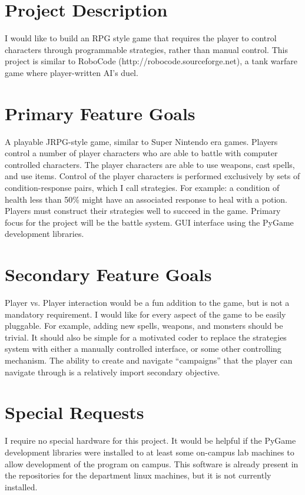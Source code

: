 \documentclass[12pt]{article}
\begin{document}
\title{}
\author{Mark Gius}
\date{\today}
\maketitle

\section{Project Description}
I would like to build an RPG style game that requires the player to control
characters through programmable strategies, rather than manual control. This
project is similar to RoboCode (http://robocode.sourceforge.net), a tank
warfare game where player-written AI's duel.

\section{Primary Feature Goals}
A playable JRPG-style game, similar to Super Nintendo era games.  Players
control a number of player characters who are able to battle with computer
controlled characters. The player characters are able to use weapons, cast
spells, and use items.  Control of the player characters is performed
exclusively by sets of condition-response pairs, which I call strategies.  For
example: a condition of health less than 50\% might have an associated response
to heal with a potion.  Players must construct their strategies well to succeed
in the game. Primary focus for the project will be the battle system. GUI
interface using the PyGame development libraries.

\section{Secondary Feature Goals}
Player vs. Player interaction would be a fun addition to the game, but is not a
mandatory requirement.  I would like for every aspect of the game to be easily
pluggable.  For example, adding new spells, weapons, and monsters should be
trivial.  It should also be simple for a motivated coder to replace the
strategies system with either a manually controlled interface, or some other
controlling mechanism.  The ability to create and navigate ``campaigns'' that
the player can navigate through is a relatively import secondary objective.

\section{Special Requests}
I require no special hardware for this project.  It would be helpful if the
PyGame development libraries were installed to at least some on-campus lab
machines to allow development of the program on campus. This software is
already present in the repositories for the department linux machines, but it
is not currently installed.
\end{document}
